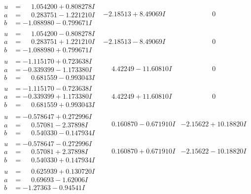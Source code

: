\documentclass[1p]{elsarticle_modified}
\theoremstyle{definition}
\begin{document}
$$\begin{array}{c|c|c}
\begin{aligned}
u &= \phantom{-}1.054200 + 0.808278 I \\
a &= \phantom{-}0.283751 - 1.221210 I \\
b &= -1.088980 - 0.799671 I\end{aligned}
 & -2.18513 + 8.49069 I & \phantom{-0.000000 } 0 \\ \hline\begin{aligned}
u &= \phantom{-}1.054200 - 0.808278 I \\
a &= \phantom{-}0.283751 + 1.221210 I \\
b &= -1.088980 + 0.799671 I\end{aligned}
 & -2.18513 - 8.49069 I & \phantom{-0.000000 } 0 \\ \hline\begin{aligned}
u &= -1.115170 + 0.723638 I \\
a &= -0.339399 - 1.173380 I \\
b &= \phantom{-}0.681559 - 0.993043 I\end{aligned}
 & \phantom{-}4.42249 - 11.60810 I & \phantom{-0.000000 } 0 \\ \hline\begin{aligned}
u &= -1.115170 - 0.723638 I \\
a &= -0.339399 + 1.173380 I \\
b &= \phantom{-}0.681559 + 0.993043 I\end{aligned}
 & \phantom{-}4.42249 + 11.60810 I & \phantom{-0.000000 } 0 \\ \hline\begin{aligned}
u &= -0.578647 + 0.272996 I \\
a &= \phantom{-}0.57081 - 2.37898 I \\
b &= \phantom{-}0.540330 - 0.147934 I\end{aligned}
 & \phantom{-}0.160870 - 0.671910 I & -2.15622 + 10.18820 I \\ \hline\begin{aligned}
u &= -0.578647 - 0.272996 I \\
a &= \phantom{-}0.57081 + 2.37898 I \\
b &= \phantom{-}0.540330 + 0.147934 I\end{aligned}
 & \phantom{-}0.160870 + 0.671910 I & -2.15622 - 10.18820 I \\ \hline\begin{aligned}
u &= \phantom{-}0.625939 + 0.130720 I \\
a &= \phantom{-}0.69693 - 1.62006 I \\
b &= -1.27363 - 0.94541 I\end{aligned}

\end{array}$$
\end{document}
